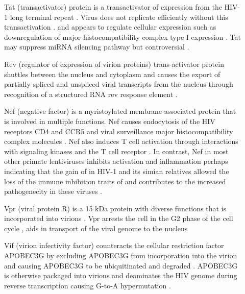 \documentclass[../sherrill-Mix_thesis.tex]{subfiles}
\begin{document}
\begin{description}
	\item[\tat{}]
		Tat (transactivator) protein is a transactivator of expression from the HIV-1 long terminal repeat \citep{Sodroski1985,Sodroski1985a,Cullen1986}. Virus does not replicate efficiently without this transactivation \citep{Dayton1986}. and appears to regulate cellular expression such as downregulation of major histocompatibility complex type I expression \citep{Howcroft1993}.  Tat may suppress miRNA silencing pathway \citep{Bennasser2005,Triboulet2007,Qian2009} but controversial \citep{Lin2007}.
	\item[\rev{}]
		Rev (regulator of expression of virion proteins) trans-activator protein shuttles between the nucleus and cytoplasm \citep{Meyer1994} and causes the export of partially spliced and unspliced viral transcripts \citep{Sodroski1986,Feinberg1986,Knight1987,Malim1988,Gutman1988} from the nucleus through recognition of a structured RNA rev response element \citep{Malim1989,Malim1989a}.
	\item[\nef{}]
			Nef (negative factor) is a myristoylated membrane associated protein \citep{Yu1992} that is involved in multiple functions. Nef causes endocytosis of the HIV receptors CD4 \citep{Garcia1991,Benson1993,Aiken1994,Lama1999,Ross1999} and CCR5 \citep{Michel2005} and viral surveillance major histocompatibility complex molecules \citep{Schwartz1996,Collins1998,Stumptner-Cuvelette2001,Blagoveshchenskaya2002}. Nef also induces T cell activation through interactions with signaling kinases and the T cell receptor \citep{Xu1999,Schrager1999,Wang2000,Simmons2001,Schrager2002}. In contrast, Nef in most other primate lentiviruses inhibits activation and inflammation \citep{Schindler2006} perhaps indicating that the gain of \vpu{} in HIV-1 and its simian relatives allowed the loss of the immune inhibition traits of \nef{} and contributes to the increased pathogenecity in these viruses \citep{Kirchhoff2008,Kirchhoff2009}.
	\item[\vpr{}]
		Vpr (viral protein R) is a 15 kDa protein \citep{Wong-Staal1987,Cohen1990} with diverse functions that is incorporated into virions \citep{Cogen1990a}. Vpr arrests the cell in the G2 phase of the cell cycle \citep{Jowett1995,Re1995,He1995,Rogel1995}, aids in transport of the viral genome to the nucleus \citep{Heinzinger1994}
	\item[\vif{}]
		Vif (virion infectivity factor) counteracts the cellular restriction factor APOBEC3G \citep{Sheehy2002} by excluding APOBEC3G from incorporation into the virion \citep{Mariani2003} and causing APOBEC3G to be ubiquitinated and degraded \citep{Sheehy2003,Marin2003,Yu2003}. APOBEC3G is otherwise packaged into virions \citep{Harris2003} and deaminates the HIV genome during reverse transcription causing G-to-A hypermutation \citep{Harris2003,Mangeat2003,Zhang2003,Lecossier2003}.

\end{description}
\end{document}
